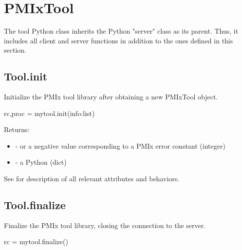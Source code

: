 \section{PMIxTool}
\label{app:python:tool}

The tool Python class inherits the Python "server" class as its parent. Thus, it includes all client and server functions in addition to the ones defined in this section.


\subsection{Tool.init}

\summary

Initialize the \ac{PMIx} tool library after obtaining a new PMIxTool object.

\format

\pyspecificstart
\begin{codepar}
rc,proc = mytool.init(info:list)
\end{codepar}
\pyspecificend


\begin{arglist}
\end{arglist}

Returns:

\begin{itemize}
    \item {} -  or a negative value corresponding to a PMIx error constant (integer)
    \item {} - a Python  (dict)
\end{itemize}

See  for description of all relevant attributes and behaviors.


\subsection{Tool.finalize}

\summary

Finalize the PMIx tool library, closing the connection to the server.

\format

\pyspecificstart
\begin{codepar}
rc = mytool.finalize()
\end{codepar}
\pyspecificend


